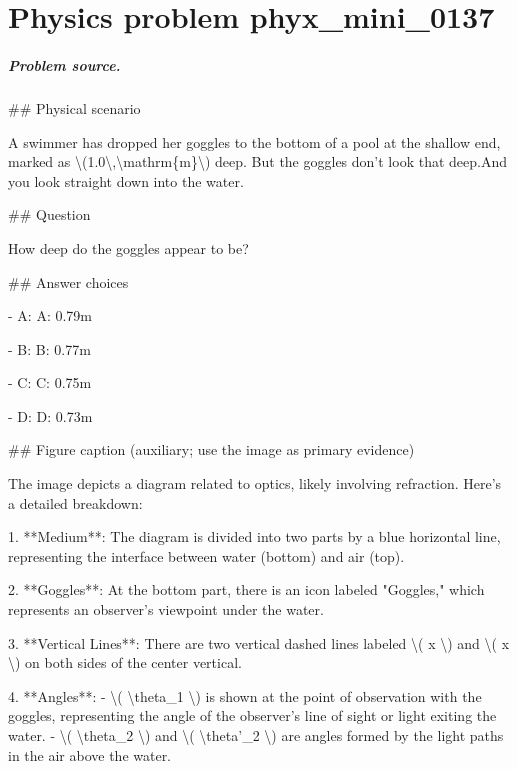 
\chapter{Physics problem phyx\_mini\_0137}
\label{ch:PhyXMiniProblems_problem_phyx_mini_0137}

\paragraph{Problem source.}
\#\# Physical scenario

A swimmer has dropped her goggles to the bottom of a pool at the shallow end, marked as \textbackslash{}(1.0\textbackslash{},\textbackslash{}mathrm\{m\}\textbackslash{}) deep. But the goggles don't look that deep.And you look straight down into the water.

\#\# Question

How deep do the goggles appear to be?

\#\# Answer choices

- A: A: 0.79m

- B: B: 0.77m

- C: C: 0.75m

- D: D: 0.73m

\#\# Figure caption (auxiliary; use the image as primary evidence)

The image depicts a diagram related to optics, likely involving refraction. Here's a detailed breakdown:

1. **Medium**: The diagram is divided into two parts by a blue horizontal line, representing the interface between water (bottom) and air (top).

2. **Goggles**: At the bottom part, there is an icon labeled "Goggles," which represents an observer's viewpoint under the water.

3. **Vertical Lines**: There are two vertical dashed lines labeled \textbackslash{}( x \textbackslash{}) and \textbackslash{}( x \textbackslash{}) on both sides of the center vertical.

4. **Angles**: 
   - \textbackslash{}( \textbackslash{}theta\_1 \textbackslash{}) is shown at the point of observation with the goggles, representing the angle of the observer's line of sight or light exiting the water.
   - \textbackslash{}( \textbackslash{}theta\_2 \textbackslash{}) and \textbackslash{}( \textbackslash{}theta'\_2 \textbackslash{}) are angles formed by the light paths in the air above the water.

